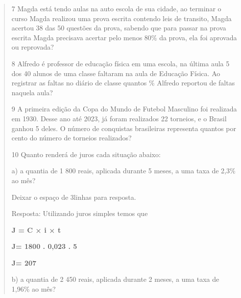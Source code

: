 \begin{quote}
\begin{escolha}
\num{7} Magda está tendo aulas na auto escola de sua cidade, ao terminar o
curso Magda realizou uma prova escrita contendo leis de transito, Magda
acertou 38 das 50 questões da prova, sabendo que para passar na prova
escrita Magda precisava acertar pelo menos 80\% da prova, ela foi
aprovada ou reprovada?


\num{8} Alfredo é professor de educação física em uma escola, na última aula
5 dos 40 alunos de uma classe faltaram na aula de Educação Física. Ao
registrar as faltas no diário de classe quantos \% Alfredo reportou de
faltas naquela aula?


\num{9} A primeira edição da Copa do Mundo de Futebol Masculino foi realizada
em 1930. Desse ano até 2023, já foram realizados 22 torneios, e o Brasil
ganhou 5 deles. O número de conquistas brasileiras representa quantos
por cento do número de torneios realizados?



\num{10} Quanto renderá de juros cada situação abaixo:

a) a quantia de 1 800 reais, aplicada durante 5 meses, a uma taxa de
2,3\% ao mês?

Deixar o espaço de 3linhas para resposta.

Resposta: Utilizando juros simples temos que

\textbf{J = C × i × t}

\textbf{J= 1800 . 0,023 . 5}

\textbf{J= 207}

b) a quantia de 2 450 reais, aplicada durante 2 meses, a uma taxa de
1,96\% ao mês?


\end{escolha}
\end{quote}

